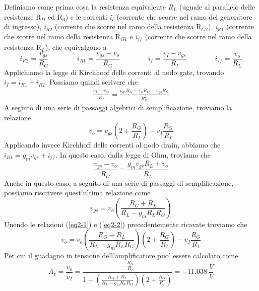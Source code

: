 \documentclass[a4paper,10pt]{article}
\begin{document}
Definiamo come prima cosa la resistenza equivalente \textit{R$_L$} (uguale al parallelo delle resistenze R$_D$ ed R$_3$) e le correnti \textit{i$_I$} (corrente che scorre nel ramo del generatore di ingresso), \textit{i$_{R2}$} (corrente che scorre nel ramo della resistenza R$_{G2}$), \textit{i$_{R1}$} (corrente che scorre nel ramo della resistenza R$_{G1}$  e \textit{i$_{//}$} (corrente che scorre nel ramo della resistenza R$_L$), che equivalgono a
\begin{equation*}
i_{R2}=\frac{v_{gs}}{R_{G}} \qquad \qquad i_{R1}=\frac{v_{gs}-v_o}{R_{G}} \qquad \qquad i_I=\frac{v_I-v_{gs}}{R_I} \qquad \qquad i_{//}=\frac{v_o}{R_L}
\end{equation*}
Applichiamo la legge di Kirchhoof delle correnti al nodo gate, trovando $i_I = i_{R1} + i_{R2}$. Possiamo quindi scrivere che 
\begin{align*}
\frac{v_I-v_{gs}}{R_I}=\frac{v_{gs}R_G-v_oR_G+v_{gs}R_G}{R_G^2}
\end{align*}
A seguito di una serie di passaggi algebrici di semplificazione, troviamo la relazione
\begin{equation}
\label{eq2-1}
v_o=v_{gs}(2+\frac{R_G}{R_I})-v_I\frac{R_G}{R_I}
\end{equation}
Applicando invece Kirchhoff delle correnti al nodo drain, abbiamo che $i_{R1} = g_mv_{gs} + i_{//}$. In questo caso, dalla legge di Ohm, troviamo che
\begin{equation*}
\frac{v_{gs}-v_o}{R_G} = \frac{g_mv_{gs}R_L+v_o}{R_L}
\end{equation*}
Anche in questo caso, a seguito di una serie di passaggi di semplificazione, possiamo riscrivere quest'ultima relazione come
\begin{equation}
\label{eq2-2}
v_{gs} = v_o \left( \frac{R_G+R_L}{R_L-g_mR_LR_G} \right)
\end{equation}
Unendo le relazioni (\ref{eq2-1}) e (\ref{eq2-2}) precedentemente ricavate troviamo che
\begin{equation*}
v_o=v_o\left(\frac{R_G+R_L}{R_L-g_mR_LR_G}\right)\left(2+\frac{R_G}{R_I}\right)-v_I\frac{R_G}{R_I}
\end{equation*}
Per cui il guadagno in tensione dell'amplificatore puo' essere calcolato come
\begin{equation}
\label{eq2-3}
A_v=\frac{v_o}{v_I} = \frac{-\frac{R_G}{R_I}}{1-\left(\frac{R_G+R_L}{R_L-g_mR_LR_G}\right)\left(2+\frac{R_G}{R_I}\right)} = -11.038\ \frac{V}{V}
\end{equation}
\end{document}
